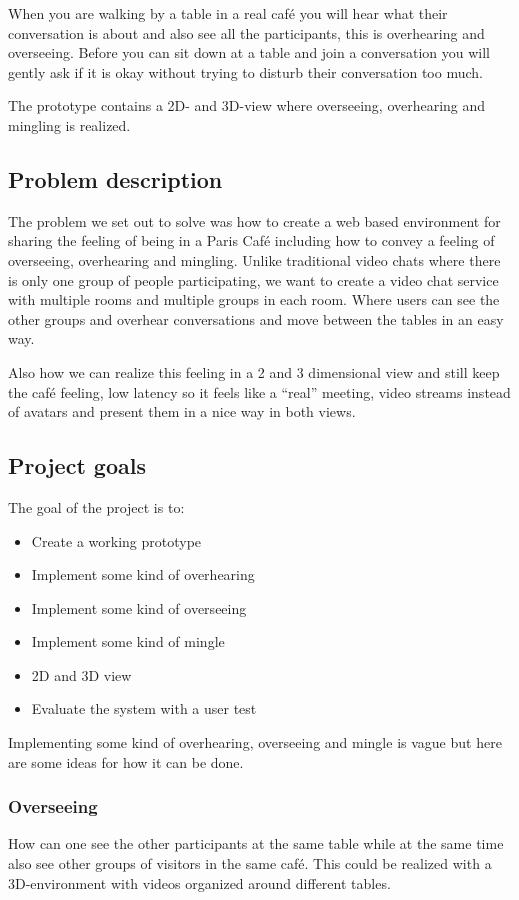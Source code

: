 \documentclass[12pt, titlepage]{article}
\begin{document}
When you are walking by a table in a real café you will hear what their conversation is about and also see all the participants, this is overhearing and overseeing. Before you can sit down at a table and join a conversation you will gently ask if it is okay without trying to disturb their conversation too much.

The prototype contains a 2D- and 3D-view where overseeing, overhearing and mingling is realized.

\subsection{Problem description}
The problem we set out to solve was how to create a web based environment for sharing the feeling of being in a Paris Café including how to convey a feeling of overseeing, overhearing and mingling. Unlike traditional video chats where there is only one group of people participating, we want to create a video chat service with multiple rooms and multiple groups in each room. Where users can see the other groups and overhear conversations and move between the tables in an easy way.

Also how we can realize this feeling in a 2 and 3 dimensional view and still keep the café feeling, low latency so it feels like a “real” meeting, video streams instead of avatars and present them in a nice way in both views.
\subsection{Project goals}
The goal of the project is to:
\begin{itemize}
  \item Create a working prototype
  \item Implement some kind of overhearing
  \item Implement some kind of overseeing
  \item Implement some kind of mingle
  \item 2D and 3D view
  \item Evaluate the system with a user test
\end{itemize}
Implementing some kind of overhearing, overseeing and mingle is vague but here are some ideas for how it can be done.
\subsubsection{Overseeing}
How can one see the other participants at the same table while at the same time also see other groups of visitors in the same café. This could be realized with a 3D-environment with videos organized around different tables.
\end{document}
